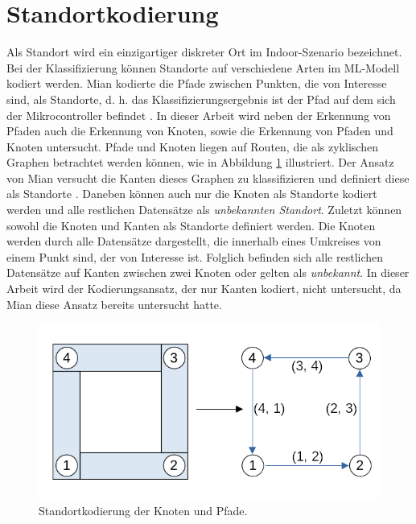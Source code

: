 \section{Standortkodierung}
\label{sec:model_location_encoding}
Als Standort wird ein einzigartiger diskreter Ort im Indoor-Szenario bezeichnet.
Bei der Klassifizierung können Standorte auf verschiedene Arten im ML-Modell kodiert werden.
Mian kodierte die Pfade zwischen Punkten, die von Interesse sind, als Standorte,
d. h. das Klassifizierungsergebnis ist der Pfad auf dem sich der Mikrocontroller befindet \cite{naveedThesis}.
\newline
\newline
In dieser Arbeit wird neben der Erkennung von Pfaden auch die Erkennung von Knoten, sowie die Erkennung von Pfaden und Knoten untersucht.
Pfade und Knoten liegen auf Routen, die als zyklischen Graphen betrachtet werden können, wie in Abbildung \ref{fig:location_encoding} illustriert.
Der Ansatz von Mian versucht die Kanten dieses Graphen zu klassifizieren und definiert diese als Standorte \cite{naveedThesis}.
Daneben können auch nur die Knoten als Standorte kodiert werden und alle restlichen Datensätze als \textit{unbekannten Standort}.
Zuletzt können sowohl die Knoten und Kanten als Standorte definiert werden.
Die Knoten werden durch alle Datensätze dargestellt, die innerhalb eines Umkreises von einem Punkt sind, der von Interesse ist.
Folglich befinden sich alle restlichen Datensätze auf Kanten zwischen zwei Knoten oder gelten als \textit{unbekannt}.
In dieser Arbeit wird der Kodierungsansatz, der nur Kanten kodiert, nicht untersucht, da Mian diese Ansatz bereits untersucht hatte.
\begin{figure}[h!]
    \centering
    \includegraphics[width=\linewidth]{images/location_encoding.png}
    \caption{Standortkodierung der Knoten und Pfade.}
    \label{fig:location_encoding}
\end{figure}
